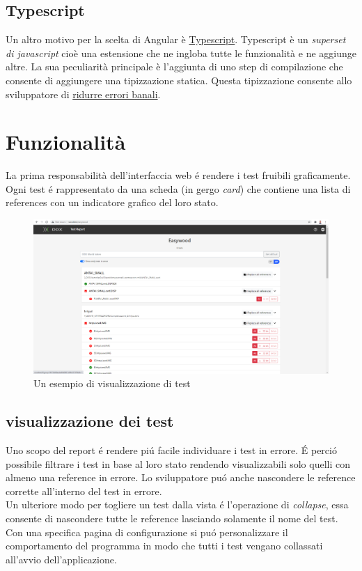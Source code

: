         \subsection{Typescript}
            Un altro motivo per la scelta di Angular è \href{https://www.typescriptlang.org}{Typescript}.
            Typescript è un \textit{superset di javascript} cioè una estensione che ne ingloba tutte le funzionalità e ne aggiunge altre.
            La sua peculiarità principale è l'aggiunta di uno step di compilazione che consente di aggiungere una tipizzazione statica.
            Questa tipizzazione consente allo sviluppatore di
            \href{https://www.quora.com/Why-is-type-checking-important-in-programming-languages-and-how-should-one-choose-between-dynamically-and-statically-typed-languages}{ridurre errori banali}.
    \section{Funzionalità}
        La prima responsabilità dell'interfaccia web \'e rendere i test fruibili graficamente.
        Ogni test \'e rappresentato da una scheda (in gergo \textit{card}) che contiene una lista di references con un indicatore grafico del loro stato.
        \begin{figure}
            \includegraphics[width=\textwidth]{images/page.png}
            \caption{Un esempio di visualizzazione di test}
        \end{figure}
        \subsection{visualizzazione dei test}        
            Uno scopo del report \'e rendere pi\'u facile individuare i test in errore.
            \'E perci\'o possibile filtrare i test in base al loro stato rendendo visualizzabili solo quelli con almeno una reference in errore.
            Lo sviluppatore pu\'o anche nascondere le reference corrette all'interno del test in errore.\\
            Un ulteriore modo per togliere un test dalla vista \'e l'operazione di \textit{collapse}, essa consente di nascondere tutte le reference lasciando solamente il nome del test.
            Con una specifica pagina di configurazione si pu\'o personalizzare il comportamento del programma in modo che tutti i test vengano collassati all'avvio dell'applicazione.
            
